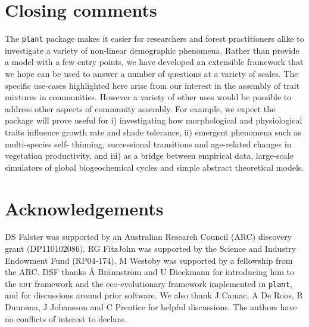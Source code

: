 \documentclass[a4paper,11pt]{article}
\newcommand{\plant}{\texttt{plant}}
\begin{document}
\section{Closing comments}

The {\plant} package makes it easier for researchers and forest
practitioners alike to investigate a variety of non-linear demographic
phenomena.  Rather than provide a model with a few entry points, we
have developed an extensible framework that we hope can be used to
answer a number of questions at a variety of scales. The specific
use-cases highlighted here arise from our interest in the assembly of
trait mixtures in communities. However a variety of other uses would
be possible to address other aspects of community assembly. For
example, we expect the package will prove useful for i) investigating
how morphological and physiological traits influence growth rate and
shade tolerance, ii) emergent phenomena such as multi-species self-
thinning, successional transitions and age-related changes in
vegetation productivity, and iii) as a bridge between empirical data,
large-scale simulators of global biogeochemical cycles and simple
abstract theoretical models.

\section{Acknowledgements}

DS Falster was supported by an Australian Research Council (ARC)
discovery grant (DP110102086). RG FitzJohn was supported by the
Science and Industry Endowment Fund (RP04-174). M Westoby was
supported by a fellowship from the ARC. DSF thanks {\AA}
Br{\"a}nnstr{\"o}m and U Dieckmann for introducing him to the \textsc{ebt}
framework and the eco-evolutionary framework implemented in {\plant}, and
for discussions around prior software. We also thank J Camac, A De Roos,
R Duursma, J Johansson and C Prentice for helpful discussions. The authors 
have no conflicts of interest to declare.
\end{document}
